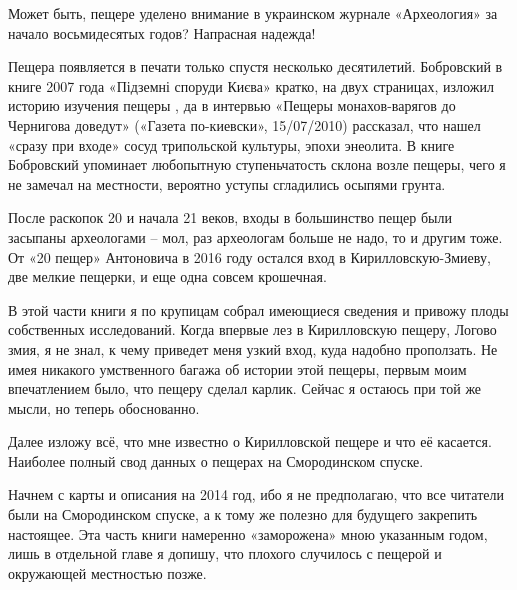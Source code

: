 Может быть, пещере уделено внимание в украинском журнале «Археология» за начало восьмидесятых годов? Напрасная надежда! 

Пещера появляется в печати только спустя несколько десятилетий. Бобровский в книге 2007 года «Підземні споруди Києва» кратко, на двух страницах, изложил историю изучения пещеры , да в интервью «Пещеры монахов-варягов до Чернигова доведут» («Газета по-киевски», 15/07/2010) рассказал, что нашел «сразу при входе» сосуд трипольской культуры, эпохи энеолита. В книге Бобровский упоминает любопытную ступеньчатость склона возле пещеры, чего я не замечал на местности, вероятно уступы сгладились осыпями грунта.

После раскопок 20 и начала 21 веков, входы в большинство пещер были засыпаны археологами – мол, раз археологам больше не надо, то и другим тоже. От «20 пещер» Антоновича в 2016 году остался вход в Кириллов\-скую-Змиеву, две мелкие пещерки, и еще одна совсем крошечная.

В этой части книги я по крупицам собрал имеющиеся сведения и привожу плоды собственных исследований. Когда впервые лез в Кирилловскую пещеру, Логово змия, я не знал, к чему приведет меня узкий вход, куда надобно проползать. Не имея никакого умственного багажа об истории этой пещеры, первым моим впечатлением было, что пещеру сделал карлик. Сейчас я остаюсь при той же мысли, но теперь обоснованно.

Далее изложу всё, что мне известно о Кирилловской пещере и что её касается. Наиболее полный свод данных о пещерах на Смородинском спуске.

Начнем с карты и описания на 2014 год, ибо я не предполагаю, что все читатели были на Смородинском спуске, а к тому же полезно для будущего закрепить настоящее. Эта часть книги намеренно «заморожена» мною указанным годом, лишь в отдельной главе я допишу, что плохого случилось с пещерой и окружающей местностью позже.
